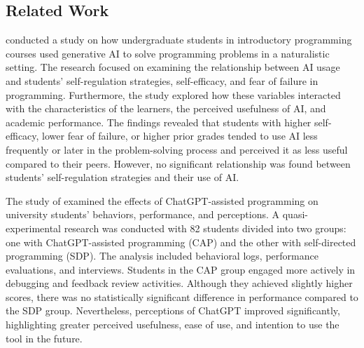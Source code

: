 \documentclass[sn-apa]{sn-jnl} %
\begin{document}
\subsection{Related Work}

\cite{Margulieux24} conducted a study on how undergraduate students in
introductory programming courses used generative AI to solve programming
problems in a naturalistic setting. The research focused on examining the
relationship between AI usage and students’ self-regulation strategies,
self-efficacy, and fear of failure in programming. Furthermore, the study
explored how these variables interacted with the characteristics of the learners,
the perceived usefulness of AI, and academic performance. The findings revealed
that students with higher self-efficacy, lower fear of failure, or higher prior
grades tended to use AI less frequently or later in the problem-solving process
and perceived it as less useful compared to their peers. However, no significant
relationship was found between students’ self-regulation strategies and their
use of AI.


The study of \cite{Boudouaia24} examined the effects of ChatGPT-assisted
programming on university students' behaviors, performance, and perceptions.
A quasi-experimental research was conducted with 82 students divided into two
groups: one with ChatGPT-assisted programming (CAP) and the other with
self-directed programming (SDP). The analysis included behavioral logs,
performance evaluations, and interviews. Students in the CAP group engaged more
actively in debugging and feedback review activities. Although they achieved
slightly higher scores, there was no statistically significant difference in
performance compared to the SDP group. Nevertheless, perceptions of ChatGPT
improved significantly, highlighting greater perceived usefulness, ease of use,
and intention to use the tool in the future.
\end{document}
